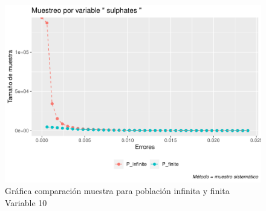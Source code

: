 \documentclass[
]{article}
\begin{document}
\begin{figure}
\centering
\includegraphics{1_examen_solucion_files/figure-latex/grafica sys10-1.pdf}
\caption{Gráfica comparación muestra para población infinita y finita
Variable 10}
\end{figure}
\end{document}
